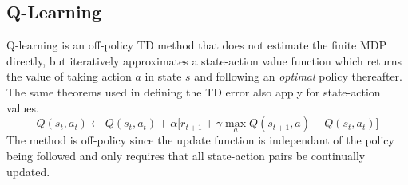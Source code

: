 \subsection{Q-Learning}
\label{sec:qlearning}
%
Q-learning is an off-policy TD method that does not estimate the finite
MDP directly, but iteratively approximates a state-action value
function which returns the value of taking action $a$ in state $s$ and
following an \textit{optimal} policy thereafter. The same theorems used in defining the TD error also apply for
state-action values.
\begin{equation}
\label{eq:qlearning}
Q(s_t,a_t) \leftarrow Q(s_t,a_t) + \alpha \bigl[r_{t+1} + \gamma\max_a
Q(s_{t+1},a)-Q(s_t,a_t) \bigr]
\end{equation}
The method is off-policy since the update function is independant of the policy
being followed and only requires that all state-action pairs be continually
updated.

